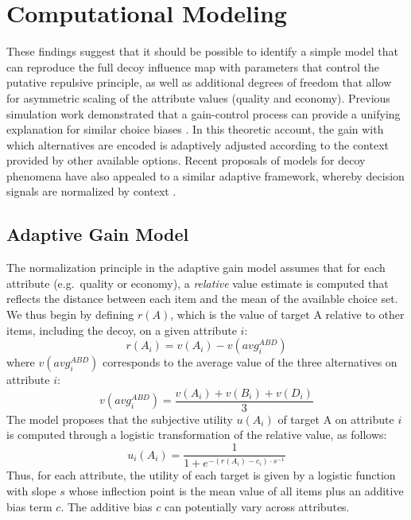 \documentclass[a4paper, nobind]{templates/ociamthesis}
\begin{document}
\hypertarget{computational-modeling}{%
\section{Computational Modeling}\label{computational-modeling}}

These findings suggest that it should be possible to identify a simple model that can reproduce the full decoy influence map with parameters that control the putative repulsive principle, as well as additional degrees of freedom that allow for asymmetric scaling of the attribute values (quality and economy). Previous simulation work demonstrated that a gain-control process can provide a unifying explanation for similar choice biases \autocite{li2018}. In this theoretic account, the gain with which alternatives are encoded is adaptively adjusted according to the context provided by other available options. Recent proposals of models for decoy phenomena have also appealed to a similar adaptive framework, whereby decision signals are normalized by context \autocite{rigoli2017,daviet2018}.

\hypertarget{adaptive-gain-model}{%
\subsection{Adaptive Gain Model}\label{adaptive-gain-model}}

The normalization principle in the adaptive gain model assumes that for each attribute (e.g.~quality or economy), a \emph{relative} value estimate is computed that reflects the distance between each item and the mean of the available choice set. We thus begin by defining \(r(A)\), which is the value of target A relative to other items, including the decoy, on a given attribute \(i\):
\begin{equation}
r(A_i) = v(A_i) - v(avg_i^{ABD})
\label{eq:decoy-ag-r}
\end{equation}
where \(v(avg_i^{ABD})\) corresponds to the average value of the three alternatives on attribute \(i\):
\begin{equation}
v(avg_i^{ABD})=\frac{v(A_i)+v(B_i)+v(D_i)}{3}
\end{equation}
The model proposes that the subjective utility \(u(A_i)\) of target A on attribute \(i\) is computed through a logistic transformation of the relative value, as follows:
\begin{equation}
u_i(A_i) = \frac{1}{1+e^{-(r(A_i)-c_i)\cdot s^{-1}}}
\label{eq:decoy-ag}
\end{equation}
Thus, for each attribute, the utility of each target is given by a logistic function with slope \(s\) whose inflection point is the mean value of all items plus an additive bias term \(c\). The additive bias \(c\) can potentially vary across attributes.
\end{document}
